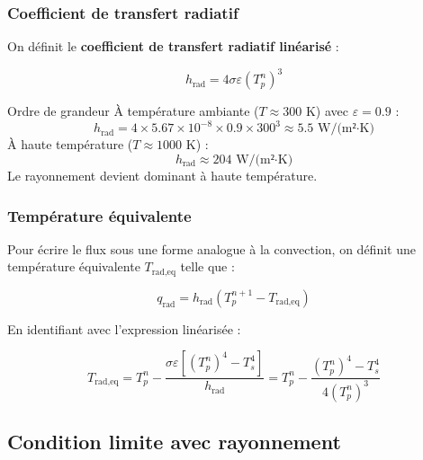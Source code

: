 \documentclass[11pt,a4paper]{article}
\begin{document}
\subsubsection{Coefficient de transfert radiatif}

On définit le \textbf{coefficient de transfert radiatif linéarisé} :

\begin{tcolorbox}[colback=green!5,colframe=vert,title=\textbf{Coefficient radiatif}]
\begin{equation}
h_{\text{rad}} = 4 \sigma \varepsilon (T_p^n)^3
\label{eq:h_rad}
\end{equation}
\end{tcolorbox}

\begin{remarque}{Ordre de grandeur}{}
À température ambiante ($T \approx 300$ K) avec $\varepsilon = 0.9$ :
\begin{equation}
h_{\text{rad}} = 4 \times 5.67 \times 10^{-8} \times 0.9 \times 300^3 \approx 5.5 \text{ W/(m²·K)}
\end{equation}
À haute température ($T \approx 1000$ K) :
\begin{equation}
h_{\text{rad}} \approx 204 \text{ W/(m²·K)}
\end{equation}
Le rayonnement devient dominant à haute température.
\end{remarque}

\subsubsection{Température équivalente}

Pour écrire le flux sous une forme analogue à la convection, on définit une température équivalente $T_{\text{rad,eq}}$ telle que :

\begin{equation}
q_{\text{rad}} = h_{\text{rad}} (T_p^{n+1} - T_{\text{rad,eq}})
\end{equation}

En identifiant avec l'expression linéarisée :

\begin{equation}
T_{\text{rad,eq}} = T_p^n - \frac{\sigma\varepsilon[(T_p^n)^4 - T_s^4]}{h_{\text{rad}}} = T_p^n - \frac{(T_p^n)^4 - T_s^4}{4(T_p^n)^3}
\end{equation}

\subsection{Condition limite avec rayonnement}
\end{document}
